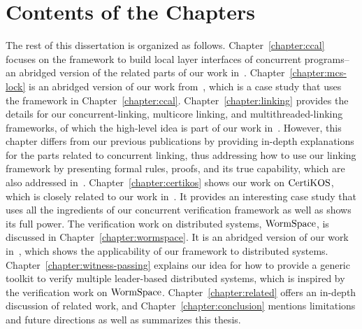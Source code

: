 \section{Contents of the Chapters}
\label{chapter:introduction:sec:contents-of-the-chapters}

The rest of this dissertation is organized as follows. Chapter~\ref{chapter:ccal} focuses on the framework to build local layer 
interfaces of concurrent programs--an abridged version of the related parts of our work in~\cite{concurrency}.
Chapter~\ref{chapter:mcs-lock} is an abridged version of our work from~\cite{mcslock},
which is a case study that uses the framework in Chapter~\ref{chapter:ccal}. 
Chapter~\ref{chapter:linking} provides the details for our concurrent-linking, multicore linking, and multithreaded-linking frameworks, 
of which the high-level idea is part of our work in~\cite{concurrency}.
However, this chapter differs from our previous publications by providing in-depth explanations for the parts related to concurrent linking, 
thus addressing how to use our linking framework by presenting formal rules, proofs, and its true capability, 
which are also addressed in~\cite{concurrency}.
Chapter~\ref{chapter:certikos} shows our work on $\mathrm{CertiKOS}$,
which is closely related to our work in~\cite{certikos:osdi16}. 
It provides an interesting case study that uses all the ingredients of our concurrent verification
 framework as well as shows its full power. The verification work on distributed systems, $\mathrm{WormSpace}$,
is discussed in Chapter~\ref{chapter:wormspace}.
It is an abridged version of our work in~\cite{wormspace},
which shows the applicability of our framework to distributed systems. 
Chapter~\ref{chapter:witness-passing} 
explains our idea for how to provide a generic toolkit to verify multiple leader-based distributed systems, 
which is inspired by the verification work on $\mathrm{WormSpace}$.
Chapter~\ref{chapter:related}
offers an in-depth discussion of related work, and  Chapter~\ref{chapter:conclusion}  
mentions limitations and future directions as well as summarizes this thesis.


